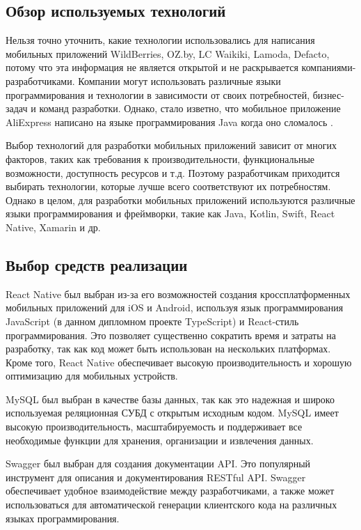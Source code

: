 \subsection{Обзор используемых технологий}

Нельзя точно уточнить, какие технологии использовались для написания мобильных приложений
WildBerries, OZ.by, LC Waikiki, Lamoda, Defacto,
потому что эта информация не является открытой и не раскрывается компаниями-разработчиками.
Компании могут использовать различные языки программирования и технологии в зависимости от своих потребностей,
бизнес-задач и команд разработки. Однако, стало изветно, что мобильное приложение AliExpress
написано на языке программирования Java когда оно сломалось \cite{AliExpressLang} \cite{AliExpressLangForum}.

Выбор технологий для разработки мобильных приложений зависит от многих факторов,
таких как требования к производительности, функциональные возможности, доступность ресурсов и т.д.
Поэтому разработчикам приходится выбирать технологии, которые лучше всего соответствуют их потребностям.
Однако в целом, для разработки мобильных приложений используются различные языки программирования и фреймворки,
такие как Java, Kotlin, Swift, React Native, Xamarin и др.

\subsection{Выбор средств реализации}

React Native \cite{ReactNativeCliGuide} был выбран из-за его возможностей создания кроссплатформенных мобильных приложений для iOS и Android,
используя язык программирования JavaScript (в данном дипломном проекте TypeScript) и React-стиль программирования.
Это позволяет существенно сократить время и затраты на разработку, так как код может быть использован на нескольких платформах.
Кроме того, React Native обеспечивает высокую производительность и хорошую оптимизацию для мобильных устройств.

MySQL \cite{MySqlInNestJs} был выбран в качестве базы данных, так как это надежная и широко используемая реляционная СУБД с открытым исходным кодом.
MySQL имеет высокую производительность, масштабируемость и поддерживает все необходимые функции для хранения, организации и извлечения данных.

Swagger \cite{SwaggerInNestJs} был выбран для создания документации API.
Это популярный инструмент для описания и документирования RESTful API.
Swagger обеспечивает удобное взаимодействие между разработчиками,
а также может использоваться для автоматической генерации клиентского кода на различных языках программирования.

